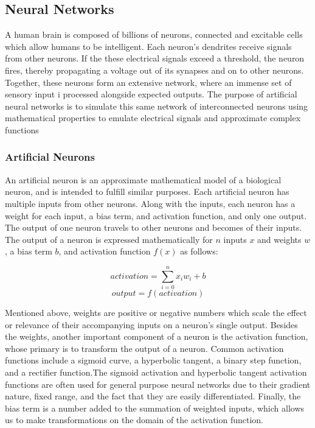 \subsection{Neural Networks}
A human brain is composed of billions of neurons, connected and excitable cells which allow humans to be intelligent. Each neuron's dendrites receive signals from other neurons. If the these electrical signals exceed a threshold, the neuron fires, thereby propagating a voltage out of its synapses and on to other neurons. Together, these neurons form an extensive network, where an immense set of sensory input i processed alongside expected outputs. The purpose of artificial neural networks is to simulate this same network of interconnected neurons using mathematical properties to emulate electrical signals and approximate complex functions
\subsubsection{Artificial Neurons}

An artificial neuron is an approximate mathematical model of a biological neuron, and is intended to fulfill similar purposes. Each artificial neuron has multiple inputs from other neurons. Along with the inputs, each neuron has a weight for each input, a bias term, and activation function, and only one output. The output of one neuron travels to other neurons and becomes of their inputs. The output of a neuron is expressed mathematically for $n$ inputs $x$ and weights $w$, a bias term $b$, and activation function $f(x)$ as follows:

$$activation = \sum\limits_{i=0}^n x_i w_i+b$$
$$output = f(activation)$$


Mentioned above, weights are positive or negative numbers which scale the effect or relevance of their accompanying inputs on a neuron's single output. Besides the weights, another important component of a neuron is the activation function, whose primary is to transform the output of a neuron. Common activation functions include a sigmoid curve, a hyperbolic tangent, a binary step function, and a rectifier function.The sigmoid activation and hyperbolic tangent activation functions are often used for general purpose neural networks due to their gradient nature, fixed range, and the fact that they are easily differentiated. Finally, the bias term is a number added to the summation of weighted inputs, which allows us to make transformations on the domain of the activation function.


